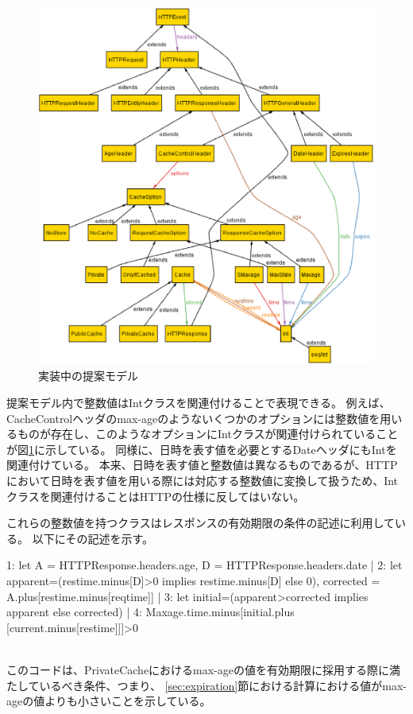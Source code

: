 \documentclass{css}
\begin{document}
\begin{figure}[htb]
\centering
\includegraphics[width=1.0\hsize]{model_alloy.eps}
\caption{実装中の提案モデル}
\label{fig:model_alloy}
\end{figure}

提案モデル内で整数値はIntクラスを関連付けることで表現できる。
例えば、CacheControlヘッダのmax-ageのようないくつかのオプションには整数値を用いるものが存在し、このようなオプションにIntクラスが関連付けられていることが図\ref{fig:model_alloy}に示している。
同様に、日時を表す値を必要とするDateヘッダにもIntを関連付けている。
本来、日時を表す値と整数値は異なるものであるが、HTTPにおいて日時を表す値を用いる際には対応する整数値に変換して扱うため、Intクラスを関連付けることはHTTPの仕様に反してはいない。

これらの整数値を持つクラスはレスポンスの有効期限の条件の記述に利用している。
以下にその記述を示す。\\\hrulefill
\begin{small}
\begin{verbatimtab}[3]
1:	let A = HTTPResponse.headers.age, 
	D = HTTPResponse.headers.date |
2:		let apparent=(restime.minus[D]>0 implies
		restime.minus[D] else 0), corrected = 
		A.plus[restime.minus[reqtime]] | 
3:			let initial=(apparent>corrected 
			implies apparent else corrected) | 
4:				Maxage.time.minus[initial.plus
				[current.minus[restime]]]>0
\end{verbatimtab}
\end{small}
\hrulefill\\
このコードは、PrivateCacheにおけるmax-ageの値を有効期限に採用する際に満たしているべき条件、つまり、
\ref{sec:expiration}節における計算における値がmax-ageの値よりも小さいことを示している。
\end{document}
